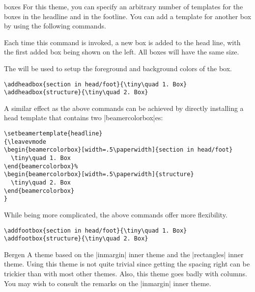 \begin{themeexample}[{\opt{|[headheight=|\meta{head height}|,footheight=|\meta{foot height}|]|}}]{boxes}
  For this theme, you can specify an arbitrary number of templates for
  the boxes in the headline and in the footline. You can add a
  template for another box by using the following commands.

  \begin{command}{\addheadbox{}}
    Each time this command is invoked, a new box is added to the head
    line, with the first added box being shown on the left. All boxes
    will have the same size.

    The  will be used to setup the foreground and
    background colors of the box.
    \example
\begin{verbatim}
\addheadbox{section in head/foot}{\tiny\quad 1. Box}
\addheadbox{structure}{\tiny\quad 2. Box}
\end{verbatim}

    A similar effect as the above commands can be achieved by directly
    installing a head template that contains two |beamercolorbox|es:
\begin{verbatim}
\setbeamertemplate{headline}
{\leavevmode
\begin{beamercolorbox}[width=.5\paperwidth]{section in head/foot}
  \tiny\quad 1. Box
\end{beamercolorbox}%
\begin{beamercolorbox}[width=.5\paperwidth]{structure}
  \tiny\quad 2. Box
\end{beamercolorbox}
}
\end{verbatim}
    While being more complicated, the above commands offer more
    flexibility.     
  \end{command}

  \begin{command}{\addfootbox{}}
    \example
\begin{verbatim}
\addfootbox{section in head/foot}{\tiny\quad 1. Box}
\addfootbox{structure}{\tiny\quad 2. Box}
\end{verbatim}
  \end{command}
\end{themeexample}

\begin{themeexample}{Bergen}
  A theme based on the |inmargin| inner theme and the |rectangles|
  inner theme. Using this theme is not quite trivial since getting the
  spacing right can be trickier than with most other themes. Also, this
  theme goes badly with columns. You may wish to consult the remarks
  on the |inmargin| inner theme.
\end{themeexample}


